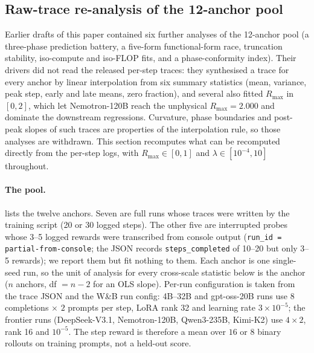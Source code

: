 %

\subsection{Raw-trace re-analysis of the 12-anchor pool}
\label{sec:p1-rawtrace}

Earlier drafts of this paper contained six further analyses of the
12-anchor pool (a three-phase prediction battery, a five-form
functional-form race, truncation stability, iso-compute and iso-FLOP
fits, and a phase-conformity index).  Their drivers did not read the
released per-step traces: they synthesised a trace for every anchor by
linear interpolation from six summary statistics (mean, variance, peak
step, early and late means, zero fraction), and several also fitted
$R_{\max}$ in $[0, 2]$, which let Nemotron-120B reach the unphysical
$R_{\max} = 2.000$ and dominate the downstream regressions.  Curvature,
phase boundaries and post-peak slopes of such traces are properties of
the interpolation rule, so those analyses are withdrawn.  This section
recomputes what can be recomputed directly from the per-step logs, with
$R_{\max} \in [0,1]$ and $\lambda \in [10^{-4}, 10]$ throughout.

\paragraph{The pool.}
 lists the twelve anchors.  Seven are full
runs whose traces were written by the training script (20 or 30 logged
steps).  The other five are interrupted probes whose 3--5 logged rewards
were transcribed from console output (\texttt{run\_id =
partial-from-console}; the JSON records \texttt{steps\_completed} of
10--20 but only 3--5 rewards); we report them but fit nothing to them.
Each anchor is one single-seed run, so the unit of analysis for every
cross-scale statistic below is the anchor ($n$ anchors, df $= n-2$ for
an OLS slope).  Per-run configuration is taken from the trace JSON and
the W\&B run config: 4B--32B and gpt-oss-20B runs use
$8$ completions $\times$ $2$ prompts per step, LoRA rank 32 and
learning rate $3\times10^{-5}$; the frontier runs (DeepSeek-V3.1,
Nemotron-120B, Qwen3-235B, Kimi-K2) use $4 \times 2$, rank 16 and
$10^{-5}$.  The step reward is therefore a mean over $16$ or $8$
binary rollouts on training prompts, not a held-out score.

